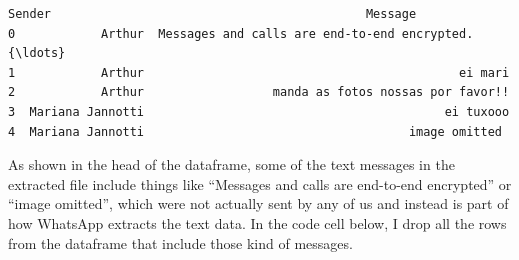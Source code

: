 \documentclass[11pt]{article}
\makeatletter
\newcommand{\boxspacing}{\kern\kvtcb@left@rule\kern\kvtcb@boxsep}
\newcommand{\prompt}[4]{
        {\ttfamily\llap{{\color{#2}[#3]:\hspace{3pt}#4}}\vspace{-\baselineskip}}
    }
\makeatother
\begin{document}
            \begin{tcolorbox}[breakable, size=fbox, boxrule=.5pt, pad at break*=1mm, opacityfill=0]
\prompt{Out}{outcolor}{3}{\boxspacing}
\begin{Verbatim}[commandchars=\\\{\}]
             Sender                                            Message
0            Arthur  ‎Messages and calls are end-to-end encrypted. {\ldots}
1            Arthur                                            ei mari
2            Arthur                  manda as fotos nossas por favor!!
3  Mariana Jannotti                                          ei tuxooo
4  Mariana Jannotti                                     ‎image omitted
\end{Verbatim}
\end{tcolorbox}
        
    As shown in the head of the dataframe, some of the text messages in the
extracted file include things like ``Messages and calls are end-to-end
encrypted'' or ``image omitted'', which were not actually sent by any of
us and instead is part of how WhatsApp extracts the text data. In the
code cell below, I drop all the rows from the dataframe that include
those kind of messages.
\end{document}
